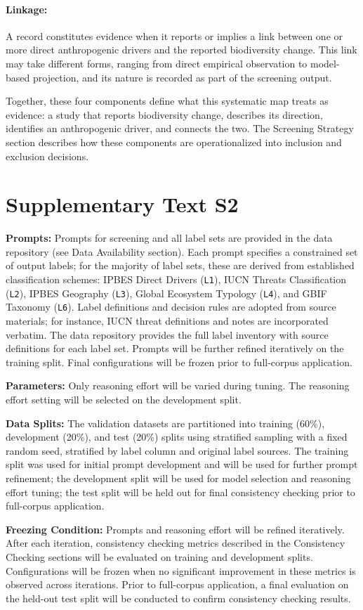 \documentclass[12pt]{article}
\begin{document}
\paragraph*{Linkage:}
A record constitutes evidence when it reports or implies a link between one or more direct anthropogenic drivers and the reported biodiversity change. This link may take different forms, ranging from direct empirical observation to model-based projection, and its nature is recorded as part of the screening output.

Together, these four components define what this systematic map treats as evidence: a study that reports biodiversity change, describes its direction, identifies an anthropogenic driver, and connects the two. The Screening Strategy section describes how these components are operationalized into inclusion and exclusion decisions.
\newpage


\section*{Supplementary Text S2}
\label{sec:prompts_configs}

\textbf{Prompts:} Prompts for screening and all label sets are provided in the data repository (see Data Availability section). Each prompt specifies a constrained set of output labels; for the majority of label sets, these are derived from established classification schemes: IPBES Direct Drivers (\texttt{L1}), IUCN Threats Classification (\texttt{L2}), IPBES Geography (\texttt{L3}), Global Ecosystem Typology (\texttt{L4}), and GBIF Taxonomy (\texttt{L6}). Label definitions and decision rules are adopted from source materials; for instance, IUCN threat definitions and notes are incorporated verbatim. The data repository provides the full label inventory with source definitions for each label set. Prompts will be further refined iteratively on the training split. Final configurations will be frozen prior to full-corpus application.

\textbf{Parameters:} Only reasoning effort will be varied during tuning. The reasoning effort setting will be selected on the development split.

\textbf{Data Splits:} The validation datasets are partitioned into training (60\%), development (20\%), and test (20\%) splits using stratified sampling with a fixed random seed, stratified by label column and original label sources. The training split was used for initial prompt development and will be used for further prompt refinement; the development split will be used for model selection and reasoning effort tuning; the test split will be held out for final consistency checking prior to full-corpus application.

\textbf{Freezing Condition:} Prompts and reasoning effort will be refined iteratively. After each iteration, consistency checking metrics described in the Consistency Checking sections will be evaluated on training and development splits. Configurations will be frozen when no significant improvement in these metrics is observed across iterations. Prior to full-corpus application, a final evaluation on the held-out test split will be conducted to confirm consistency checking results.
\end{document}
